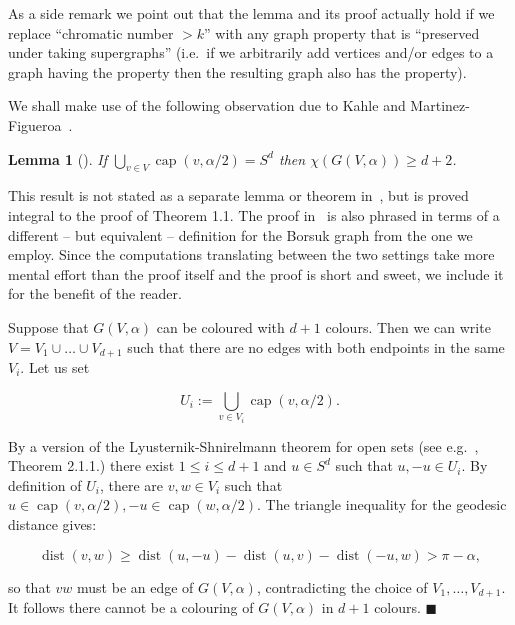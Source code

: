 \documentclass[11pt]{article}%
\newenvironment{proof}{\vspace{1ex}\noindent{\bf Proof.}}{\hspace*{\fill}$\blacksquare$\vspace{1ex}}
\newtheorem{lemma}[lemma]{Lemma}
\DeclareMathOperator{\dist}{dist}
\DeclareMathOperator{\kap}{cap}
\begin{document}
As a side remark we point out that the lemma and its proof actually hold 
if we replace ``chromatic number $>k$'' with any graph property that is ``preserved under taking supergraphs''
(i.e.~if we arbitrarily add vertices and/or edges to a graph having the property then the 
resulting graph also has the property).

\noindent
We shall make use of the following observation due to Kahle and Martinez-Figueroa~\cite{KahleFig}.

\begin{lemma}[\cite{KahleFig}]\label{lem:KFchi}
If $\displaystyle \bigcup_{v\in V} \kap(v,\alpha/2) = S^d$ then 
$\displaystyle \chi( G(V,\alpha) ) \geq d+2$.
\end{lemma}

This result is not stated as a separate lemma or theorem in~\cite{KahleFig}, but is proved 
integral to the proof of Theorem 1.1. The proof in~\cite{KahleFig} is also phrased 
in terms of a different -- but equivalent -- definition
for the Borsuk graph from the one we employ. 
Since the computations translating between the two settings take more mental effort 
than the proof itself and the proof is short and sweet, we include it for the benefit of the reader.

\begin{proof}
Suppose that $G(V,\alpha)$ can be coloured with $d+1$ colours. 
Then we can write $V=V_1\cup\dots\cup V_{d+1}$ such that there are no 
edges with both endpoints in the same $V_i$.
Let us set 

$$ U_i := \bigcup_{v \in V_i} \kap(v,\alpha/2). $$

\noindent
By a version of the Lyusternik-Shnirelmann theorem for open sets (see e.g.~\cite{MatousekBorsukUlam}, Theorem 2.1.1.) 
there exist $1\leq i\leq d+1$ and $u \in S^d$ such that $u,-u \in U_i$.
By definition of $U_i$, there are $v,w \in V_i$ such that $u \in \kap(v,\alpha/2), -u \in \kap(w,\alpha/2)$.
The triangle inequality for the geodesic distance gives:

$$ \dist(v,w) \geq \dist(u,-u) - \dist(u,v) - \dist(-u,w) 
> \pi - \alpha, $$

\noindent
so that $vw$ must be an edge of $G(V,\alpha)$, contradicting 
the choice of $V_1,\dots,V_{d+1}$. It follows there cannot be a colouring of $G(V,\alpha)$ in $d+1$ colours.
\end{proof}
\end{document}
